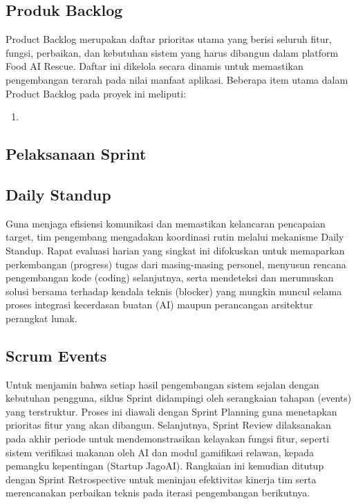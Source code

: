\subsection{Produk Backlog}
Product Backlog merupakan daftar prioritas utama yang berisi seluruh fitur, fungsi, perbaikan, dan kebutuhan sistem yang harus dibangun dalam platform Food AI Rescue. Daftar ini dikelola secara dinamis untuk memastikan pengembangan terarah pada nilai manfaat aplikasi. Beberapa item utama dalam Product Backlog pada proyek ini meliputi:
\begin{enumerate}
    \item 
\end{enumerate}
\subsection{Pelaksanaan Sprint}

\subsection{Daily Standup}
Guna menjaga efisiensi komunikasi dan memastikan kelancaran pencapaian target, tim pengembang mengadakan koordinasi rutin melalui mekanisme Daily Standup. Rapat evaluasi harian yang singkat ini difokuskan untuk memaparkan perkembangan (progress) tugas dari masing-masing personel, menyusun rencana pengembangan kode (coding) selanjutnya, serta mendeteksi dan merumuskan solusi bersama terhadap kendala teknis (blocker) yang mungkin muncul selama proses integrasi kecerdasan buatan (AI) maupun perancangan arsitektur perangkat lunak.

\subsection{Scrum Events}
Untuk menjamin bahwa setiap hasil pengembangan sistem sejalan dengan kebutuhan pengguna, siklus Sprint didampingi oleh serangkaian tahapan (events) yang terstruktur. Proses ini diawali dengan Sprint Planning guna menetapkan prioritas fitur yang akan dibangun. Selanjutnya, Sprint Review dilaksanakan pada akhir periode untuk mendemonstrasikan kelayakan fungsi fitur, seperti sistem verifikasi makanan oleh AI dan modul gamifikasi relawan, kepada pemangku kepentingan (Startup JagoAI). Rangkaian ini kemudian ditutup dengan Sprint Retrospective untuk meninjau efektivitas kinerja tim serta merencanakan perbaikan teknis pada iterasi pengembangan berikutnya.

